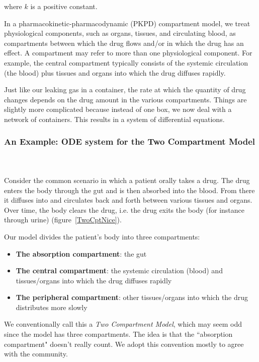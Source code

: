 \documentclass[11pt]{amsart}
\begin{document}
where $k$ is a positive constant.

In a pharmacokinetic-pharmacodynamic (PKPD) compartment model, we treat physiological components, such as organs, tissues, and circulating blood, as compartments between which the drug flows and/or in which the drug has an effect. A compartment may refer to more than one physiological component. For example, the central compartment typically consists of the systemic circulation (the blood) plus tissues and organs into which the drug diffuses rapidly.

Just like our leaking gas in a container, the rate at which the quantity of drug changes depends on the drug amount in the various compartments. Things are slightly more complicated because instead of one box, we now deal with a network of containers. This results in a system of differential equations.

\subsubsection{An Example: ODE system for the Two Compartment Model} \ \\ \ \\
Consider the common scenario in which a patient orally takes a drug. The drug enters the body through the gut and is then absorbed into the blood. From there it diffuses into and circulates back and forth between various tissues and organs. Over time, the body clears the drug, i.e. the drug exits the body (for instance through urine)  (figure~\ref{TwoCptNice}).

Our model divides the patient's body into three compartments:
\begin{itemize}
  \item \textbf{The absorption compartment}: the gut
  \item \textbf{The central compartment}: the systemic circulation (blood) and tissues/organs into which the drug diffuses rapidly
  \item \textbf{The peripheral compartment}: other tissues/organs into which the drug distributes more slowly
\end{itemize}

We conventionally call this a \textit{Two Compartment Model}, which may seem odd since the model has three compartments. The idea is that the ``absorption compartment" doesn't really count. We adopt this convention mostly to agree with the community.
\end{document}

